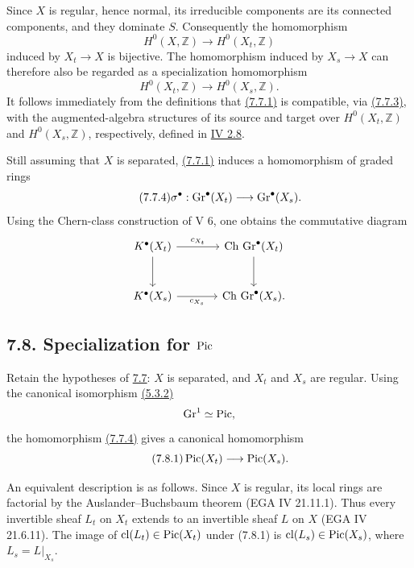 Since $X$ is regular, hence normal, its irreducible components are its
connected components, and they dominate $S$. Consequently the homomorphism
\[
H^0(X,\mathbb Z)\longrightarrow H^0(X_t,\mathbb Z)
\]
induced by $X_t\to X$ is bijective. The homomorphism induced by
$X_s\to X$ can therefore also be regarded as a specialization homomorphism
\begin{equation}\tag{7.7.3}
H^0(X_t,\mathbb Z)\longrightarrow H^0(X_s,\mathbb Z).
\end{equation}
It follows immediately from the definitions that \hyperlink{sga6.e10.eq.7-7-1}{(7.7.1)} is compatible,
via \hyperlink{sga6.e10.eq.7-7-3}{(7.7.3)}, with the augmented-algebra structures of its source and target
over $H^0(X_t,\mathbb Z)$ and $H^0(X_s,\mathbb Z)$, respectively, defined
in \hyperlink{sga6.e04.para.2-8}{IV 2.8}.

Still assuming that $X$ is separated, \hyperlink{sga6.e10.eq.7-7-1}{(7.7.1)} induces a homomorphism of
graded rings
\begin{equation}\tag{7.7.4}
\sigma^\bullet:\operatorname{Gr}^\bullet(X_t)\longrightarrow\operatorname{Gr}^\bullet(X_s).
\end{equation}
Using the Chern-class construction of V 6, one obtains the commutative
diagram
\[
\begin{tikzcd}[column sep=large,row sep=large]
K^\bullet(X_t) \arrow[r,"c_{X_t}"] \arrow[d] &
\Ch\,\Gr^\bullet(X_t) \arrow[d]\\
K^\bullet(X_s) \arrow[r,"c_{X_s}"'] &
\Ch\,\Gr^\bullet(X_s).
\end{tikzcd}
\]

\subsection*{7.8. Specialization for $\operatorname{Pic}$}
Retain the hypotheses of \hyperlink{sga6.e10.sec.7.7}{7.7}: $X$ is separated, and $X_t$ and $X_s$ are
regular. Using the canonical isomorphism \hyperlink{sga6.e10.thm.5-3-2}{(5.3.2)}
\[
\operatorname{Gr}^1\simeq\operatorname{Pic},
\]
the homomorphism \hyperlink{sga6.e10.eq.7-7-4}{(7.7.4)} gives a canonical homomorphism
\begin{equation}\tag{7.8.1}
\operatorname{Pic}(X_t)\longrightarrow\operatorname{Pic}(X_s).
\end{equation}

An equivalent description is as follows. Since $X$ is regular, its local
rings are factorial by the Auslander--Buchsbaum theorem (EGA IV 21.11.1).
Thus every invertible sheaf $L_t$ on $X_t$ extends to an invertible sheaf
$L$ on $X$ (EGA IV 21.6.11). The image of
$\operatorname{cl}(L_t)\in\operatorname{Pic}(X_t)$ under (7.8.1) is
$\operatorname{cl}(L_s)\in\operatorname{Pic}(X_s)$, where $L_s=L|_{X_s}$.

